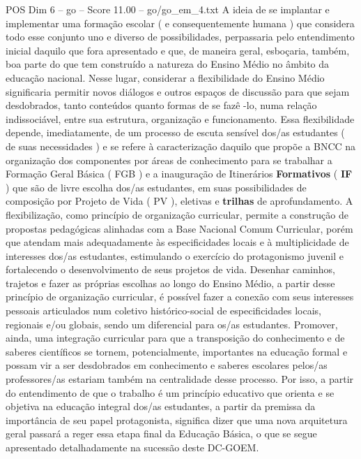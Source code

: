 \begin{textsample}{POS Dim 6 – go – Score 11.00 – go/go\_em\_4.txt}
A ideia de se implantar e implementar uma formação escolar ( e consequentemente humana ) que considera todo esse conjunto uno e diverso de possibilidades, perpassaria pelo entendimento inicial daquilo que fora apresentado e que, de maneira geral, esboçaria, também, boa parte do que tem construído a natureza do Ensino Médio no âmbito da educação nacional.
Nesse lugar, considerar a flexibilidade do Ensino Médio significaria permitir novos diálogos e outros espaços de discussão para que sejam desdobrados, tanto conteúdos quanto formas de se fazê -lo, numa relação indissociável, entre sua estrutura, organização e funcionamento.
Essa flexibilidade depende, imediatamente, de um processo de escuta sensível dos/as estudantes ( de suas necessidades ) e se refere à caracterização daquilo que propõe a BNCC na organização dos componentes por áreas de conhecimento para se trabalhar a Formação Geral Básica ( FGB ) e a inauguração de Itinerários \textbf{Formativos} ( \textbf{IF} ) que são de livre escolha dos/as estudantes, em suas possibilidades de composição por Projeto de Vida ( PV ), eletivas e \textbf{trilhas} de aprofundamento.
A flexibilização, como princípio de organização curricular, permite a construção de propostas pedagógicas alinhadas com a Base Nacional Comum Curricular, porém que atendam mais adequadamente às especificidades locais e à multiplicidade de interesses dos/as estudantes, estimulando o exercício do protagonismo juvenil e fortalecendo o desenvolvimento de seus projetos de vida.
Desenhar caminhos, trajetos e fazer as próprias escolhas ao longo do Ensino Médio, a partir desse princípio de organização curricular, é possível fazer a conexão com seus interesses pessoais articulados num coletivo histórico-social de especificidades locais, regionais e/ou globais, sendo um diferencial para os/as estudantes.
Promover, ainda, uma integração curricular para que a transposição do conhecimento e de saberes científicos se tornem, potencialmente, importantes na educação formal e possam vir a ser desdobrados em conhecimento e saberes escolares pelos/as professores/as estariam também na centralidade desse processo.
Por isso, a partir do entendimento de que o trabalho é um princípio educativo que orienta e se objetiva na educação integral dos/as estudantes, a partir da premissa da importância de seu papel protagonista, significa dizer que uma nova arquitetura geral passará a reger essa etapa final da Educação Básica, o que se segue apresentado detalhadamente na sucessão deste DC-GOEM.

\end{textsample}
